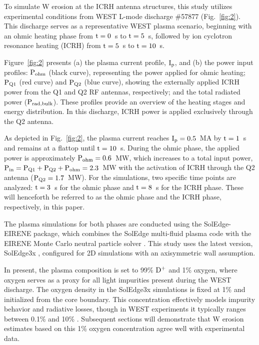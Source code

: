 \documentclass[10pt]{iopart}
\begin{document}
To simulate W erosion at the ICRH antenna structures, this study utilizes experimental conditions from WEST L-mode discharge \#57877 (Fig.~\ref{fig:2}). This discharge serves as a representative WEST plasma scenario, beginning with an ohmic heating phase from \(\rm t=0\)~s to \(\rm t=5\)~s, followed by ion cyclotron resonance heating (ICRH) from \(\rm t=5\)~s to \(\rm t=10\)~s.

Figure~\ref{fig:2} presents (a) the plasma current profile, \(\rm I_p\), and (b) the power input profiles: \(\rm P_{ohm}\) (black curve), representing the power applied for ohmic heating; \(\rm P_{Q1}\) (red curve) and \(\rm P_{Q2}\) (blue curve), showing the externally applied ICRH power from the Q1 and Q2 RF antennas, respectively; and the total radiated power (\(\rm P_{rad, bulk}\)). These profiles provide an overview of the heating stages and energy distribution. In this discharge, ICRH power is applied exclusively through the Q2 antenna.

As depicted in Fig.~\ref{fig:2}, the plasma current reaches \(\rm I_p=0.5\)~MA by \(\rm t=1\)~s and remains at a flattop until \(\rm t=10\)~s. During the ohmic phase, the applied power is approximately \(\rm P_{ohm}=0.6\)~MW, which increases to a total input power, $\rm P_{in}=P_{Q1}+P_{Q2}+P_{ohm}=2.3$~MW  with the activation of ICRH  through the Q2 antenna (\(\rm P_{Q2}=1.7\)~MW). For the simulations, two specific time points are analyzed: \(\rm t=3\)~s for the ohmic phase and \(\rm t=8\)~s for the ICRH phase. These will henceforth be referred to as the ohmic phase and the ICRH phase, respectively, in this paper.


The plasma simulations for both phases are conducted using the SolEdge-EIRENE package, which combines the SolEdge multi-fluid plasma code \cite{Bufferand_2015} with the EIRENE Monte Carlo neutral particle solver \cite{Reiter_2005}. This study uses the latest version, SolEdge3x \cite{Bufferand_2019, Bufferand_2021}, configured for 2D simulations with an axisymmetric wall assumption.

In present, the plasma composition is set to 99\% $\rm D^+$ and 1\% oxygen, where oxygen serves as a proxy for all light impurities present during the WEST discharge. The oxygen density in the SolEdge3x simulations is fixed at 1\% and initialized from the core boundary. This concentration effectively models impurity behavior and radiative losses, though in WEST experiments it typically ranges between 0.1\% and 10\% \cite{Ciraolo_2019, Klepper2022}. Subsequent sections will demonstrate that W erosion estimates based on this 1\% oxygen concentration agree well with experimental data.
\end{document}
